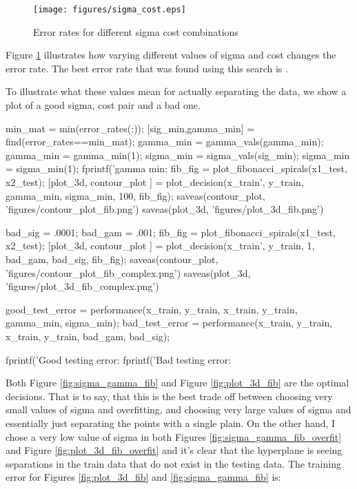 \documentclass[11pt, twoside]{article}   	%
\newenvironment{matlab}{\comment}{\endcomment}
\begin{document}
\begin{figure}[h]
\centering
\texttt{[image: figures/sigma\_cost.eps]}
\caption{Error rates for different sigma cost combinations}
\label{fig:sigma_cost} 
\end{figure}

Figure \ref{fig:sigma_cost} illustrates how varying different values of
sigma and cost changes the error rate. The best error rate that was found
using this search is .

To illustrate what these values mean for actually separating the data, we
show a plot of a good sigma, cost pair and a bad one. 

\begin{matlab}
min_mat = min(error_rates(:));
[sig_min,gamma_min] = find(error_rates==min_mat);
gamma_min = gamma_vals(gamma_min);
gamma_min = gamma_min(1); 
sigma_min = sigma_vals(sig_min);
sigma_min = sigma_min(1); 
fprintf('gamma min: %
fib_fig = plot_fibonacci_spirals(x1_test, x2_test); 
[plot_3d, contour_plot ] = plot_decision(x_train', y_train, gamma_min, sigma_min, 100, fib_fig);
saveas(contour_plot, 'figures/contour_plot_fib.png')
saveas(plot_3d, 'figures/plot_3d_fib.png')

bad_sig = .0001;
bad_gam = .001;
fib_fig = plot_fibonacci_spirals(x1_test, x2_test);
[plot_3d, contour_plot ] = plot_decision(x_train', y_train, 1, bad_gam, bad_sig, fib_fig);
saveas(contour_plot, 'figures/contour_plot_fib_complex.png')
saveas(plot_3d, 'figures/plot_3d_fib_complex.png')

good_test_error = performance(x_train, y_train, x_train, y_train, gamma_min, sigma_min);
bad_test_error = performance(x_train, y_train, x_train, y_train, bad_gam, bad_sig);

fprintf('Good testing error: %
fprintf('Bad testing error: %

\end{matlab}

Both Figure \ref{fig:sigma_gamma_fib} and Figure \ref{fig:plot_3d_fib} are
the optimal decisions. That is to say, that this is the best trade off
between choosing very small values of sigma and overfitting, and choosing
very large values of sigma and essentially just separating the points with
a single plain. On the other hand, I chose a very low value of sigma in
both Figures \ref{fig:sigma_gamma_fib_overfit} and Figure
\ref{fig:plot_3d_fib_overfit} and it's clear that the hyperplane is seeing
separations in the train data that do not exist in the testing data.  The training error
for Figures \ref{fig:plot_3d_fib} and \ref{fig:sigma_gamma_fib} is:
\end{document}
